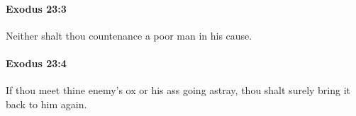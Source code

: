 		\paragraph{Exodus 23:3} %
			\label{EXODUS-23-3}

			Neither shalt thou countenance a poor man in his cause.


		\paragraph{Exodus 23:4} %
			\label{EXODUS-23-4}

			If thou meet thine enemy's ox or his ass going astray, thou shalt surely bring it back to him again.


